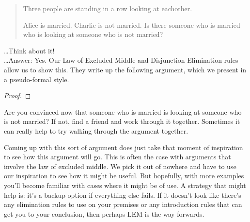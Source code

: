 \begin{quote}
Three people are standing in a row looking at eachother. 
\begin{center}
\end{center}
Alice is married. Charlie is not married. Is there someone who is married who is looking at someone who is not married?
\end{quote} \ldots Think about it! \\\ldots Answer: Yes. 
Our Law of Excluded Middle and Disjunction Elimination rules allow us to show this. They write up the following argument, which we present in a pseudo-formal style.
\begin{proof}
	\LEM
	\open
	\close
	\open
	\close
\end{proof}Are you convinced now that someone who is married is looking at someone who is not married? If not, find a friend and work through it together. Sometimes it can really help to try walking through the argument together. 

Coming up with this sort of argument does just take that moment of inspiration to see how this argument will go. This is often the case with arguments that involve the law of excluded middle. We pick it out of nowhere and have to use our inspiration to see how it might be useful. But hopefully, with more examples you'll become familiar with cases where it might be of use. A strategy that might help is: it's a backup option if everything else fails. If it doesn't look like there's any elimination rules to use on your premises or any introduction rules that can get you to your conclusion, then perhaps LEM is the way forwards. 




